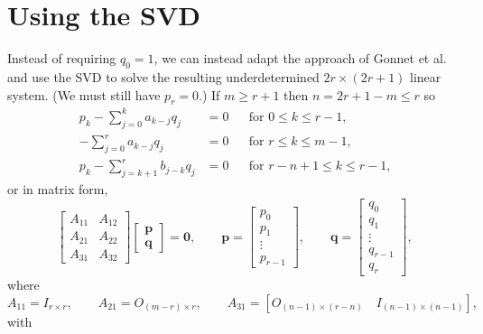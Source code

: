 \documentclass[12pt,a4paper]{article}
\begin{document}
\section{Using the SVD}
Instead of requiring $q_0=1$, we can instead adapt the approach of Gonnet et 
al.~\cite{GonnetEtAl2013} and use the SVD to solve the resulting underdetermined
$2r\times(2r+1)$ linear system.  (We must still have $p_r=0$.) If $m\ge r+1$ 
then $n=2r+1-m\le r$ so
\[
\begin{aligned}
p_k-\sum_{j=0}^k a_{k-j}q_j&=0&&\text{for $0\le k\le r-1$,}\\
-\sum_{j=0}^r a_{k-j}q_j&=0&&\text{for $r\le k\le m-1$,}\\
p_k-\sum_{j=k+1}^rb_{j-k}q_j&=0&&\text{for $r-n+1\le k\le r-1$,}
\end{aligned}
\]
or in matrix form,
\[
\begin{bmatrix}A_{11}&A_{12}\\ A_{21}&A_{22}\\ A_{31}&A_{32}\end{bmatrix}
\begin{bmatrix}\boldsymbol{p}\\ \boldsymbol{q}\end{bmatrix}=\boldsymbol{0},
\qquad\boldsymbol{p}=\begin{bmatrix}p_0\\ p_1\\ \vdots\\ p_{r-1}\end{bmatrix},
\qquad\boldsymbol{q}=\begin{bmatrix}q_0\\ q_1\\ \vdots\\ q_{r-1}\\q_r
\end{bmatrix},
\]
where
\[
A_{11}=I_{r\times r},\qquad
A_{21}=O_{(m-r)\times r},\qquad
A_{31}=[O_{(n-1)\times(r-n)}\quad I_{(n-1)\times(n-1)}],
\]
with
\end{document}
